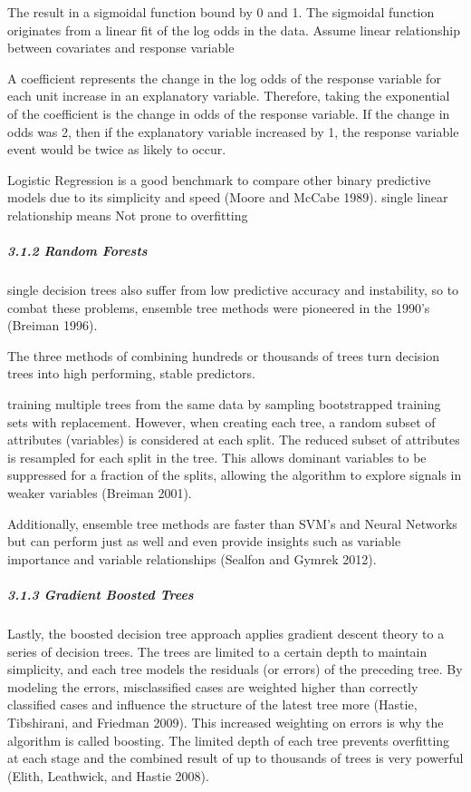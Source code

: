 \documentclass[]{elsarticle} %
\begin{document}
The result in a sigmoidal function bound by 0 and 1. The sigmoidal
function originates from a linear fit of the log odds in the data.
Assume linear relationship between covariates and response variable

A coefficient represents the change in the log odds of the response
variable for each unit increase in an explanatory variable. Therefore,
taking the exponential of the coefficient is the change in odds of the
response variable. If the change in odds was 2, then if the explanatory
variable increased by 1, the response variable event would be twice as
likely to occur.

Logistic Regression is a good benchmark to compare other binary
predictive models due to its simplicity and speed (Moore and McCabe
1989). single linear relationship means Not prone to overfitting

\subparagraph{3.1.2 Random Forests}\label{random-forests}

single decision trees also suffer from low predictive accuracy and
instability, so to combat these problems, ensemble tree methods were
pioneered in the 1990's (Breiman 1996).

The three methods of combining hundreds or thousands of trees turn
decision trees into high performing, stable predictors.

training multiple trees from the same data by sampling bootstrapped
training sets with replacement. However, when creating each tree, a
random subset of attributes (variables) is considered at each split. The
reduced subset of attributes is resampled for each split in the tree.
This allows dominant variables to be suppressed for a fraction of the
splits, allowing the algorithm to explore signals in weaker variables
(Breiman 2001).

Additionally, ensemble tree methods are faster than SVM's and Neural
Networks but can perform just as well and even provide insights such as
variable importance and variable relationships (Sealfon and Gymrek
2012).

\subparagraph{3.1.3 Gradient Boosted
Trees}\label{gradient-boosted-trees}

Lastly, the boosted decision tree approach applies gradient descent
theory to a series of decision trees. The trees are limited to a certain
depth to maintain simplicity, and each tree models the residuals (or
errors) of the preceding tree. By modeling the errors, misclassified
cases are weighted higher than correctly classified cases and influence
the structure of the latest tree more (Hastie, Tibshirani, and Friedman
2009). This increased weighting on errors is why the algorithm is called
boosting. The limited depth of each tree prevents overfitting at each
stage and the combined result of up to thousands of trees is very
powerful (Elith, Leathwick, and Hastie 2008).
\end{document}
